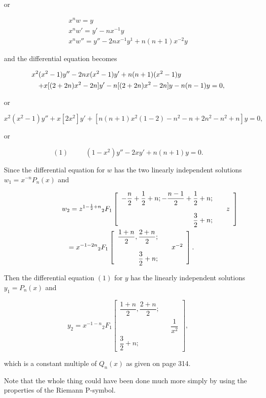 \begin{solution}
or

$$\begin{array}{ll}
x^n w = y \\
x^n w' = y' - nx^{-1}y \\
x^n w'' = y'' - 2nx^{-1}y^1 + n(n+1)x^{-2}y
\end{array}$$

and the differential equation becomes

\begin{eqnarray*}
\lefteqn{x^2(x^2-1)y'' - 2nx(x^2-1)y' + n(n+1)(x^2-1)y } \\ 
& & + x[(2+2n)x^2-2n]y' - n[(2+2n)x^2-2n]y - n(n-1)y = 0,
\end{eqnarray*}

or

$$x^2(x^2-1)y'' + x[2x^2]y' + [n(n+1)x^2(1-2)-n^2-n+2n^2-n^2+n]y = 0,$$

or

$$(1) \hspace{30pt} (1-x^2)y'' - 2xy' + n(n+1)y = 0.$$

Since the differential equation for $w$ has the two linearly independent solutions $w_1 =x^{-n}P_n(x)$ and

\begin{eqnarray*}
\lefteqn{w_2 = z^{1 - \frac{1}{2} + n} {}_2F_1 \left[ \begin{array}{rlr}
-\dfrac{n}{2} + \dfrac{1}{2} + n; - \dfrac{n-1}{2} + \dfrac{1}{2} + n; & & \\
& & z \\
\dfrac{3}{2} + n; & &
\end{array} \right]} \\
&& = x^{-1-2n} {}_2F_1 \left[ \begin{array}{rlr}
\dfrac{1+n}{2}, \dfrac{2+n}{2}; & & \\
& & x^{-2} \\
\dfrac{3}{2} + n; & &
\end{array} \right].
\end{eqnarray*}

Then the differential equation $(1)$ for $y$ has the linearly independent solutions $y_1=P_n(x)$ and

$$y_2 = x^{-1-n} {}_2F_1 \left[ \begin{array}{rlr}
\dfrac{1+n}{2}, \dfrac{2+n}{2}; & & \\
& & \dfrac{1}{x^2} \\
\dfrac{3}{2} + n; & &
\end{array} \right],$$

which is a constant multiple of $Q_n(x)$ as given on page 314.

Note that the whole thing could have been done much more simply by using the properties of the Riemann P-symbol.
\end{solution}
